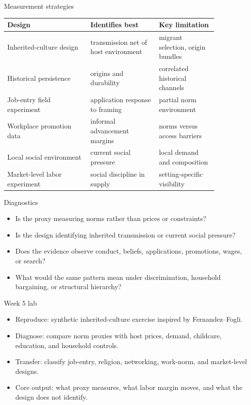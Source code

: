 \documentclass[aspectratio=169,11pt]{beamer}
\begin{document}
\begin{frame}{Measurement strategies}
\small
\begin{tabular}{p{0.34\linewidth} p{0.28\linewidth} p{0.24\linewidth}}
\toprule
Design & Identifies best & Key limitation \\
\midrule
Inherited-culture design & transmission net of host environment & migrant selection, origin bundles \\
Historical persistence & origins and durability & correlated historical channels \\
Job-entry field experiment & application response to framing & partial norm environment \\
Workplace promotion data & informal advancement margins & norms versus access barriers \\
Local social environment & current social pressure & local demand and composition \\
Market-level labor experiment & social discipline in supply & setting-specific visibility \\
\bottomrule
\end{tabular}
\end{frame}

\begin{frame}{Diagnostics}
\begin{itemize}
    \item Is the proxy measuring norms rather than prices or constraints?
    \item Is the design identifying inherited transmission or current social pressure?
    \item Does the evidence observe conduct, beliefs, applications, promotions, wages, or search?
    \item What would the same pattern mean under discrimination, household bargaining, or structural hierarchy?
\end{itemize}
\end{frame}

\begin{frame}{Week 5 lab}
\begin{itemize}
    \item Reproduce: synthetic inherited-culture exercise inspired by Fernandez--Fogli.
    \item Diagnose: compare norm proxies with host prices, demand, childcare, education, and household controls.
    \item Transfer: classify job-entry, religion, networking, work-norm, and market-level designs.
    \item Core output: what proxy measures, what labor margin moves, and what the design does not identify.
\end{itemize}
\end{frame}
\end{document}
